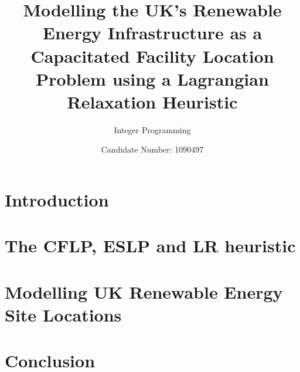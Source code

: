 \documentclass[12pt,a4paper]{article}
\title{Modelling the UK's Renewable Energy Infrastructure as a Capacitated Facility Location Problem using a Lagrangian Relaxation Heuristic}
\author{Integer Programming}
\date{Candidate Number: 1090497}
\begin{document}
\maketitle

\thispagestyle{empty}

\newpage
\setcounter{page}{1}


\section{Introduction}

\section{The CFLP, ESLP and LR heuristic}\label{sec:2}

\section{Modelling UK Renewable Energy Site Locations}\label{sec:3}

\section{Conclusion}\label{sec:conclusion}

\printbibliography
\end{document}
